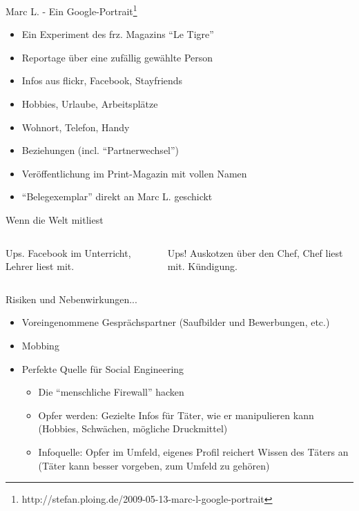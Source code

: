 \begin{frame}{Marc L. - Ein Google-Portrait\footnote{http://stefan.ploing.de/2009-05-13-marc-l-google-portrait}}
	\begin{itemize}
		\item Ein Experiment des frz. Magazins "`Le Tigre"'
		\item<2-> Reportage über eine zufällig gewählte Person
		\item<2-> Infos aus flickr, Facebook, Stayfriends
		\item<3-> Hobbies, Urlaube, Arbeitsplätze
		\item<3-> Wohnort, Telefon, Handy
		\item<3-> Beziehungen (incl. "`Partnerwechsel"')
		\item<4-> Veröffentlichung im Print-Magazin mit vollen Namen
		\item<4-> "`Belegexemplar"' direkt an Marc L. geschickt
	\end{itemize}
\end{frame}

\begin{frame}{Wenn die Welt mitliest}
	\begin{columns}

		Ups. Facebook im Unterricht, Lehrer liest mit.

		Ups! Auskotzen über den Chef, Chef liest mit. Kündigung.
	\end{columns}
\end{frame}

\begin{frame}{Risiken und Nebenwirkungen...}
	\begin{itemize}
		\item Voreingenommene Gesprächspartner (Saufbilder und Bewerbungen, etc.)
		\item Mobbing
		\item Perfekte Quelle für Social Engineering
		\begin{itemize}
			\item<2-> Die "`menschliche Firewall"' hacken
			\item<3-> Opfer werden: Gezielte Infos für Täter, wie er manipulieren kann (Hobbies, Schwächen, mögliche Druckmittel)
			\item<3-> Infoquelle: Opfer im Umfeld, eigenes Profil reichert Wissen des Täters an (Täter kann besser vorgeben, zum Umfeld zu gehören)
		\end{itemize}
	\end{itemize}
\end{frame}

